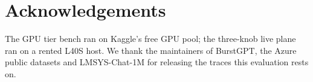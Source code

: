 \documentclass[preprint,review,12pt]{elsarticle}
\renewcommand{\_}{\ifmmode\origunderscore\else\textunderscore\allowbreak\fi}
\begin{document}
\section*{Acknowledgements}
The GPU tier bench ran on Kaggle's free GPU pool; the three-knob live plane
ran on a rented L40S host. We thank the maintainers of BurstGPT, the Azure
public datasets and LMSYS-Chat-1M for releasing the traces this evaluation
rests on.

\appendix




\end{document}
